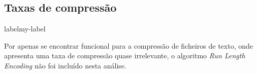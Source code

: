 \documentclass[a4paper,12pt,titlepage]{article}
\begin{document}
\subsection{Taxas de compressão}
\begin{table}[h]
\caption{Compressão obtida por cada algoritmo implementado sobre diferentes tipos de ficheiros}label{my-label}
\end{table}
Por apenas se encontrar funcional para a compressão de ficheiros de texto, onde apresenta uma taxa de compressão quase irrelevante, o algoritmo \emph{Run Length Encoding} não foi incluído nesta análise.
\end{document}
